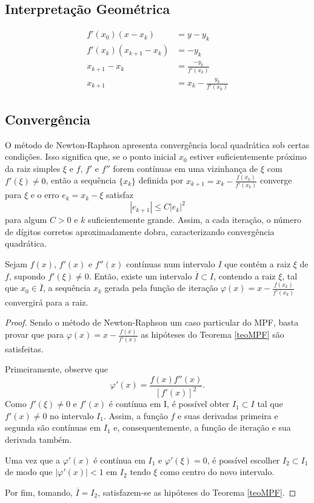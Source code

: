 \subsection{Interpretação Geométrica}
\begin{align*}
    f'(x_0)(x - x_k) &= y - y_k \\
    f'(x_k)(x_{k+1} - x_k) &= -y_k \\
    x_{k+1} - x_k &= \frac{-y_k}{f'(x_k)} \\
    x_{k+1} &= x_k - \frac{y_k}{f'(x_k)}
\end{align*}
\subsection{Convergência}
O método de Newton-Raphson apresenta convergência local quadrática sob certas condições. Isso significa que, se o ponto inicial $x_0$ estiver suficientemente próximo da raiz simples $\xi$ e $f$, $f'$ e $f''$ forem contínuas em uma vizinhança de $\xi$ com $f'(\xi) \neq 0$, então a sequência $\{x_k\}$ definida por $x_{k+1} = x_k - \frac{f(x_k)}{f'(x_k)}$ converge para $\xi$ e o erro $e_{k} = x_k - \xi$ satisfaz
\[
|e_{k+1}| \leq C |e_k|^2
\]
para algum $C > 0$ e $k$ suficientemente grande. Assim, a cada iteração, o número de dígitos corretos aproximadamente dobra, caracterizando convergência quadrática.
\begin{teo} \label{teoNR}
    Sejam $f(x)$, $f'(x)$ e $f''(x)$ contínuas num intervalo $I$ que contém a raiz $\xi$ de $f$, supondo $f'(\xi) \neq 0$. Então, existe um intervalo $\overline{I} \subset I$, contendo a raiz $\xi$, tal que $x_0 \in \overline{I}$, a sequência ${x_k}$ gerada pela função de iteração $\varphi(x) = x - \frac{f(x_k)}{f'(x_k)}$ convergirá para a raiz.
\end{teo}
\begin{proof}
    Sendo o método de Newton-Raphson um caso particular do MPF, basta provar que para $\varphi(x) = x - \frac{f(x)}{f'(x)}$ as hipóteses do Teorema \ref{teoMPF} são satisfeitas. 
    
    Primeiramente, observe que 
    \begin{equation} \label{dphiNR}
        \varphi'(x) = \frac{f(x)f''(x)}{[f'(x)]^2}.
    \end{equation}
    Como $f'(\xi) \neq 0$ e $f'(x)$ é contínua em I, é possível obter $I_1 \subset I$ tal que $f'(x) \neq 0$ no intervalo $I_1$. Assim, a função $f$ e suas derivadas primeira e segunda são contínuas em $I_1$ e, consequentemente, a função de iteração e sua derivada também.
    
     Uma vez que a $\varphi'(x)$ é contínua em $I_1$ e $\varphi'(\xi) = 0$, é possível escolher $I_2 \subset I_1$ de modo que $|\varphi'(x)| < 1$ em $I_2$ tendo $\xi$ como centro do novo intervalo.

    Por fim, tomando, $\overline{I} = I_2$, satisfazem-se as hipóteses do Teorema \ref{teoMPF}.
\end{proof}
